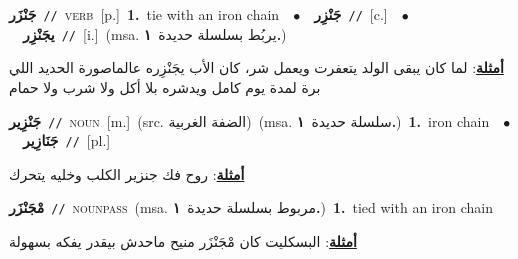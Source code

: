 \documentclass[10pt,a4paper,twoside]{article} %
\begin{document}
\begin{multicols}{2}
{\setlength\topsep{0pt}\textbf{\foreignlanguage{arabic}{جَنْزَر}}\ {\color{gray}\texttt{//}\color{black}}\ \textsc{verb}\ [p.]\ \textbf{1.}~tie with an iron chain\ \ $\bullet$\ \ \setlength\topsep{0pt}\textbf{\foreignlanguage{arabic}{جَنْزِر}}\ {\color{gray}\texttt{//}\color{black}}\ [c.]\ \ $\bullet$\ \ \setlength\topsep{0pt}\textbf{\foreignlanguage{arabic}{يجَنْزِر}}\ {\color{gray}\texttt{//}\color{black}}\ [i.]\ \color{gray}(msa. \foreignlanguage{arabic}{يربُط بسلسلة حديدة}~\foreignlanguage{arabic}{\textbf{١.}})\color{black}\  \begin{flushright}\color{gray}\foreignlanguage{arabic}{\textbf{\underline{\foreignlanguage{arabic}{أمثلة}}}: لما كان يبقى الولد يتعفرت ويعمل شر، كان الأب يجَنْزِره عالماصورة الحديد اللي برة لمدة يوم كامل ويدشره بلا أكل ولا شرب ولا حمام}\end{flushright}\color{black}} \vspace{2mm}

{\setlength\topsep{0pt}\textbf{\foreignlanguage{arabic}{جَنْزِير}}\ {\color{gray}\texttt{//}\color{black}}\ \textsc{noun}\ [m.]\ (src. \color{gray}\foreignlanguage{arabic}{الضفة الغربية}\color{black})\ \color{gray}(msa. \foreignlanguage{arabic}{سلسلة حديدة}~\foreignlanguage{arabic}{\textbf{١.}})\color{black}\ \textbf{1.}~iron chain\ \ $\bullet$\ \ \setlength\topsep{0pt}\textbf{\foreignlanguage{arabic}{جَنَازِير}}\ {\color{gray}\texttt{//}\color{black}}\ [pl.]\  \begin{flushright}\color{gray}\foreignlanguage{arabic}{\textbf{\underline{\foreignlanguage{arabic}{أمثلة}}}: روح فك جنزير الكلب وخليه يتحرك}\end{flushright}\color{black}} \vspace{2mm}

{\setlength\topsep{0pt}\textbf{\foreignlanguage{arabic}{مْجَنْزَر}}\ {\color{gray}\texttt{//}\color{black}}\ \textsc{noun\textunderscore pass}\ \color{gray}(msa. \foreignlanguage{arabic}{مربوط بسلسلة حديدة}~\foreignlanguage{arabic}{\textbf{١.}})\color{black}\ \textbf{1.}~tied with an iron chain\  \begin{flushright}\color{gray}\foreignlanguage{arabic}{\textbf{\underline{\foreignlanguage{arabic}{أمثلة}}}: البسكليت كان مْجَنْزَر منيح ماحدش بيقدر يفكه بسهولة}\end{flushright}\color{black}} \vspace{2mm}


\end{multicols}
\end{document}

